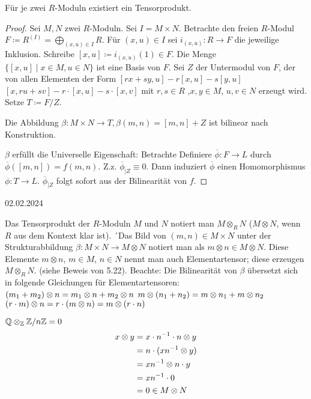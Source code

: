 \documentclass[../main.tex]{subfiles}
\begin{document}
\begin{theorem}
    Für je zwei $R$-Moduln existiert ein Tensorprodukt.
\end{theorem}
\begin{proof}
    Sei $M,N$ zwei $R$-Moduln. Sei $I=M\times N$.
    Betrachte den freien $R$-Modul $F\coloneqq R^{(I)} = \bigoplus_{(x,u)\in I} R$.
    Für $(x,u)\in I$ sei $i_{(x,u)}:R\rightarrow F$ die jeweilige Inklusion.
    Schreibe $[x,u] \coloneqq i_{(x,u)} (1)\in F$.
    Die Menge $\{[x,u]\mid x\in M, u\in N\}$ ist eine Basis von $F$.
    Sei $Z$ der Untermodul von $F$, der von allen Elementen der Form $[rx+sy,u] - r[x,u] - s[y,u]$
    $[x, ru+sv] - r\cdot [x,u] - s\cdot [x,v]$ mit $r,s\in R$ ,$x,y\in M$, $u,v\in N$ erzeugt wird.
    Setze $T\coloneqq F/Z.$

    Die Abbildung $\beta:M\times N \rightarrow T, \beta(m,n) = [m,n]+Z$ ist bilinear nach Konstruktion.

    $\beta$ erfüllt die Universelle Eigenschaft:
    Betrachte 
    Definiere $\overline{\phi}:F\rightarrow L$ durch $\overline{\phi} ([m,n]) = f(m,n)$.
    Z.z. $\overline{\phi}_{|Z} \equiv 0$. Dann induziert $\overline{\phi}$ einen Homomorphismus $\phi: T\rightarrow L$.
    $\overline{\phi}_{|Z}$ folgt sofort aus der Bilinearität von $f$.
\end{proof}
\begin{flushright}
    02.02.2024
\end{flushright}
\begin{remark}[Notation]
    Das Tensorprodukt der $R$-Moduln $M$ und $N$ notiert man $M\otimes_R N$
    ($M\otimes N$, wenn $R$ aus dem Kontext klar ist).
    ´Das Bild von $(m,n)\in M\times N$ unter der Strukturabbildung $\beta: M\times N \rightarrow M\otimes N$ notiert man als $m\otimes n\in M\otimes N$.
    Diese Elemente $m\otimes n$, $m\in M$, $n\in N$ nennt man auch Elementartensor; diese erzeugen $M\otimes_R N$. (siehe Beweis von 5.22).
    Beachte: Die Bilinearität von $\beta$ übersetzt sich in folgende Gleichungen für Elementartensoren:
    $(m_1 + m_2)\otimes n = m_1\otimes n + m_2 \otimes n$
    $m\otimes (n_1 + n_2)=m\otimes n_1 + m\otimes n_2$
    $(r\cdot m)\otimes n = r\cdot (m\otimes n) = m\otimes (r\cdot n)$
\end{remark}
\begin{example}
    $\mathbb{Q}\otimes_{\mathbb{Z}} \mathbb{Z}/n\mathbb{Z} = 0$
    \begin{align*}
        x\otimes y &= x\cdot n^{-1}\cdot n \otimes y\\
        &= n\cdot (xn^{-1}\otimes y)\\
        &= xn^{-1}\otimes n\cdot y\\
        &= xn^{-1}\cdot 0\\
        &= 0\in M\otimes N
    \end{align*}
\end{example}
\end{document}
